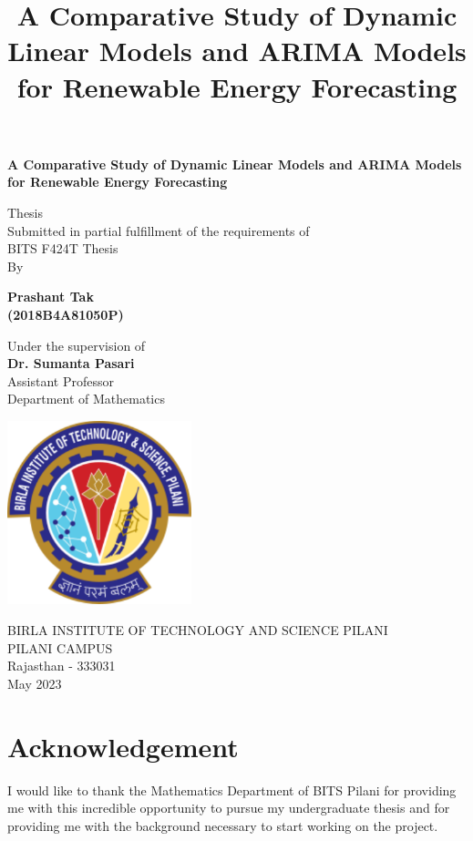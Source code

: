 \documentclass[a4paper,12pt]{article}
\date{}
\title{A Comparative Study of Dynamic Linear Models and ARIMA Models for Renewable Energy Forecasting}
\begin{document}
\begin{titlepage}
    \begin{center}
        \Large
        \textbf{A Comparative Study of Dynamic Linear Models and ARIMA Models for Renewable Energy Forecasting}

        \vspace{0.5cm}
        \large
        Thesis \\
        Submitted in partial fulfillment of the requirements of\\
        BITS F424T Thesis \\
        By

        \vspace{0.5cm}

        \textbf{Prashant Tak} \\
        \textbf{(2018B4A81050P)}

        \vspace{0.5cm}
        \vfill

        Under the supervision of\\
        \textbf{Dr. Sumanta Pasari}\\
        Assistant Professor\\
        Department of Mathematics

        \vspace{0.8cm}

        \includegraphics[width=0.4\textwidth]{bitslogo.pdf}

        \normalsize
        BIRLA INSTITUTE OF TECHNOLOGY AND SCIENCE PILANI\\
        PILANI CAMPUS\\
        Rajasthan - 333031\\
        May 2023

    \end{center}
\end{titlepage}
\pagebreak

\section{Acknowledgement}
\label{sec:orgcfe4dcd}
I would like to thank the Mathematics Department of BITS Pilani for providing me with this incredible opportunity to pursue my undergraduate thesis and for providing me with the background necessary to start working on the project.
\end{document}

